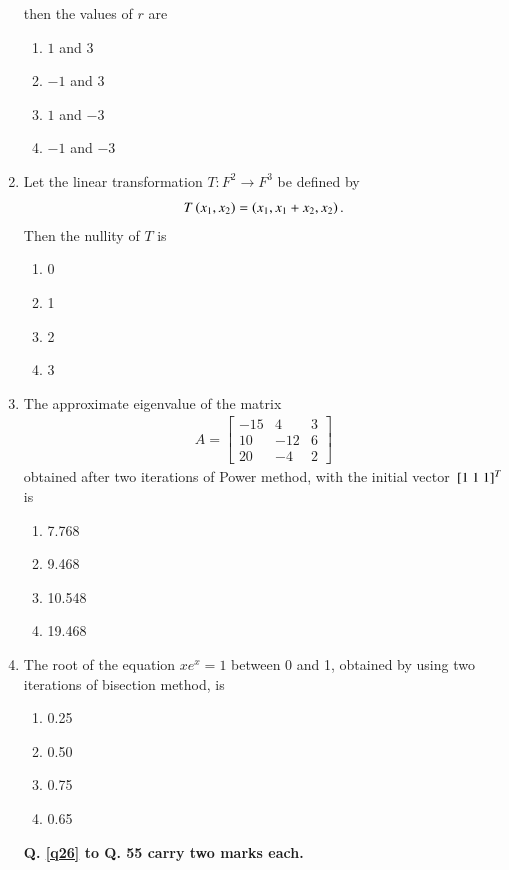 \documentclass[journal]{IEEEtran}
\begin{document}
\begin{enumerate}
then the values of $r$ are
\begin{enumerate}
    \item $1$ and $3$
    \item $-1$ and $3$
    \item $1$ and $-3$
    \item $-1$ and $-3$
\end{enumerate}
\item Let the linear transformation $T : F^2 \rightarrow F^3$ be defined by
\begin{align*}
T \left(x_1, x_2\right) = \left(x_1, x_1 + x_2, x_2\right).
\end{align*}
Then the nullity of $T$ is

\begin{enumerate}
    \item 0
    \item 1
    \item 2
    \item 3
\end{enumerate}

\item The approximate eigenvalue of the matrix
\begin{align*}
A = \begin{bmatrix}
-15 & 4 & 3 \\
10 & -12 & 6 \\
20 & -4 & 2 
\end{bmatrix}
\end{align*}
obtained after two iterations of Power method, with the initial vector ${}\left[1 \ 1 \ 1\right]^T$ is

\begin{enumerate}
    \item 7.768
    \item 9.468
    \item 10.548
    \item 19.468
\end{enumerate}
\item The root of the equation $x e^x = 1$ between 0 and 1, obtained by using two iterations of bisection method, is
\begin{enumerate}
    \item 0.25
    \item 0.50
    \item 0.75
    \item 0.65
\end{enumerate}

\textbf{ Q. \ref{q26} to Q. 55 carry two marks each.}


\end{enumerate}
\end{document}
